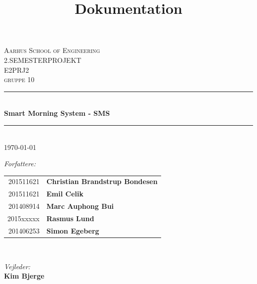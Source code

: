 \documentclass[11pt]{article}
\title{Dokumentation}
\begin{document}
\begin{titlepage}

\newcommand{\HRule}{\rule{\linewidth}{0.5mm}} %

\center %
 

\textsc{\LARGE Aarhus School of Engineering}\\[1.0cm] %
\textsc{\Large 2.SEMESTERPROJEKT}\\[0.1cm]
\textsc{\large E2PRJ2}\\[0.3cm]
\textsc{\large gruppe 10}\\[0.3cm] %


\HRule \\[0.4cm]
{ \huge \bfseries Smart Morning System - SMS}\\[0.1cm] %
\HRule \\[0.6cm]


{\large \today}\\[0.5cm] %
 

\begin{minipage}[t]{0.4\textwidth}
\raggedright \large
\emph{Forfattere:}\\
\begin{tabular}[t]{@{}r@{ }l@{}}
	201511621 & \textbf{Christian Brandstrup Bondesen}\\
	201511621 & \textbf{Emil Celik}\\
	201408914 & \textbf{Marc Auphong Bui}\\
	2015xxxxx & \textbf{Rasmus Lund}\\
	201406253 & \textbf{Simon Egeberg}\\
  \end{tabular}
\end{minipage}
~
\begin{minipage}[t]{0.4\textwidth}
\raggedleft \large
\emph{Vejleder:} \\
\textbf{Kim Bjerge} %
\vfill
\end{minipage}\\[0.8cm]



\end{titlepage}
\end{document}
